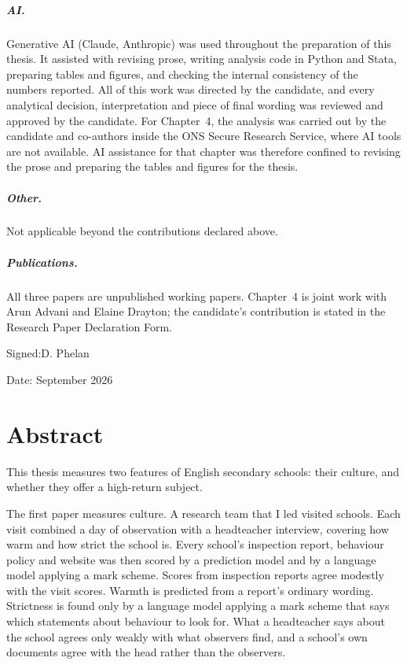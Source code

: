 \documentclass[12pt, a4paper]{report}
\begin{document}
\paragraph{AI.}
Generative AI (Claude, Anthropic) was used throughout the preparation
of this thesis. It assisted with revising prose, writing analysis code
in Python and Stata, preparing tables and figures, and checking the
internal consistency of the numbers reported. All of this work was
directed by the candidate, and every analytical decision,
interpretation and piece of final wording was reviewed and approved by
the candidate. For Chapter~4, the analysis was carried out by the
candidate and co-authors inside the ONS Secure Research Service, where
AI tools are not available. AI assistance for that chapter was
therefore confined to revising the prose and preparing the tables and
figures for the thesis.

\paragraph{Other.}
Not applicable beyond the contributions declared above.

\paragraph{Publications.}
All three papers are unpublished working papers. Chapter~4 is joint work
with Arun Advani and Elaine Drayton; the candidate's contribution is
stated in the Research Paper Declaration Form.

\vspace{1.5cm}
\ifdefined\DepositVersion\else
\noindent Signed:\enspace D. Phelan\par
\vspace{0.6cm}
\fi
\noindent Date: September 2026

\chapter*{Abstract}

This thesis measures two features of English secondary schools: their
culture, and whether they offer a high-return subject.

The first paper measures culture. A research team that I led visited
\NTierOne{} schools. Each visit combined a day of observation with a
headteacher interview, covering how warm and how strict the school is. Every school's inspection report, behaviour policy and
website was then scored by a prediction model and by a language model
applying a mark scheme. Scores from inspection reports agree modestly with
the visit scores. Warmth is predicted from a report's ordinary wording.
Strictness is found only by a language model applying
a mark scheme that says which statements about behaviour to look for. What
a headteacher says about the school agrees only weakly with what observers
find, and a school's own documents agree with the head rather than the
observers.
\end{document}
